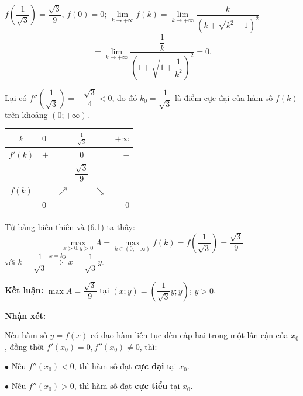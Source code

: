 \documentclass[12pt]{report}
\begin{document}
\noindent $f\left(\dfrac{1}{\sqrt{3}}\right) = \dfrac{\sqrt{3}}{9}$, $f(0) = 0$; $\lim\limits_{k \to +\infty} f(k) = \lim\limits_{k \to +\infty} \dfrac{k}{\left(k + \sqrt{k^2+1}\right)^2}$
\[
= \lim\limits_{k \to +\infty} \dfrac{\dfrac{1}{k}}{\left(1 + \sqrt{1 + \dfrac{1}{k^2}}\right)^2} = 0.
\]

\vspace{0.2cm}
\noindent Lại có $f''\left(\dfrac{1}{\sqrt{3}}\right) = -\dfrac{\sqrt{3}}{4} < 0$, do đó $k_0 = \dfrac{1}{\sqrt{3}}$ là điểm cực đại của hàm số $f(k)$ trên khoảng $(0; +\infty)$.

\vspace{0.4cm}
\begin{center}
\renewcommand{\arraystretch}{1.5}
\begin{tabular}{|c|lcr|}
\hline
$k$ & $0$ & $\frac{1}{\sqrt{3}}$ & $+\infty$ \\ \hline
$f'(k)$ & \quad $+$ & $0$ & $-$ \quad \\ \hline
 & & $\dfrac{\sqrt{3}}{9}$ & \\
$f(k)$ & & $\nearrow \quad \quad \quad \searrow$ & \\
 & $0$ & & $0$ \\ \hline
\end{tabular}
\end{center}
\vspace{0.4cm}

\noindent Từ bảng biến thiên và (6.1) ta thấy:
\[
\max_{x>0, y>0} A = \max_{k \in (0; +\infty)} f(k) = f\left(\dfrac{1}{\sqrt{3}}\right) = \dfrac{\sqrt{3}}{9}
\]
\noindent với $k = \dfrac{1}{\sqrt{3}} \overset{x=ky}{\implies} x = \dfrac{1}{\sqrt{3}}y$.

\vspace{0.2cm}
\noindent \textbf{Kết luận:} $\max A = \dfrac{\sqrt{3}}{9}$ tại $(x; y) = \left(\dfrac{1}{\sqrt{3}}y; y\right)$; $y > 0$.

\vspace{0.3cm}
\noindent \textbf{Nhận xét:}

\noindent Nếu hàm số $y = f(x)$ có đạo hàm liên tục đến cấp hai trong một lân cận của $x_0$, đồng thời $f'(x_0) = 0, f''(x_0) \neq 0$, thì:

\vspace{0.2cm}
\noindent $\bullet$ Nếu $f''(x_0) < 0$, thì hàm số đạt \textbf{cực đại} tại $x_0$.

\vspace{0.1cm}
\noindent $\bullet$ Nếu $f''(x_0) > 0$, thì hàm số đạt \textbf{cực tiểu} tại $x_0$.
\end{document}
